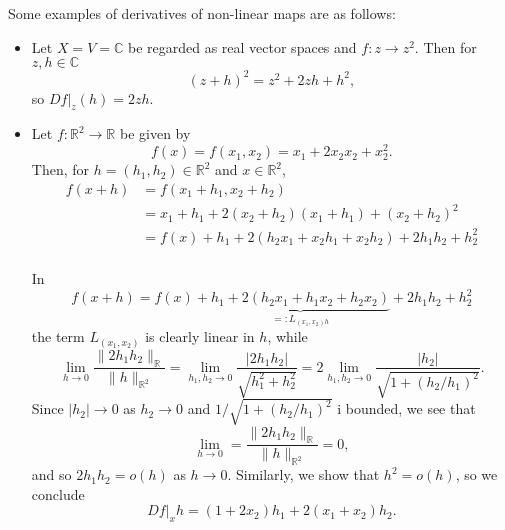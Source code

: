 \documentclass[10pt]{article}
\newcommand{\C}{\mathbb{C}}
\newcommand{\R}{\mathbb{R}}
\begin{document}
  \begin{example}
    Some examples of derivatives of non-linear maps are as follows:
    \begin{itemize}
      \item Let $X = V = \C$ be regarded as real vector spaces and $f:z \to z^{2}$.
      Then for $z,h \in \C$
      \[
        (z+h)^{2} = z^{2}+2zh+h^{2},  
      \]
      so $Df|_{z}(h) = 2zh$.

      \item Let $f:\R^{2} \to \R$ be given by 
      \[
        f(x) = f(x_{1},x_{2}) = x_{1} + 2x_{2}x_{2} + x_{2}^{2}.  
      \]
      Then, for $h = (h_{1}, h_{2}) \in \R^{2}$ and $x \in \R^{2}$,
      \[
        \begin{aligned}
          f(x+h) &= f(x_{1}+h_{1}, x_{2}+h_{2})\\
                 &= x_{1}+h_{1} + 2(x_{2}+h_{2})(x_{1}+h_{1}) + (x_{2}+h_{2})^{2}\\
                 &= f(x) + h_{1} + 2(h_{2}x_{1}+x_{2}h_{1}+x_{2}h_{2})+2h_{1}h_{2}+h_{2}^{2}\\
        \end{aligned}  
      \]
      
      In
      \[
        f(x+h) = f(x) + \underbrace{h_{1} + 2(h_{2}x_{1} + h_{1}x_{2} + h_{2}x_{2})}_{=:L_{(x_{1},x_{2})h}} + 2h_{1}h_{2} + h_{2}^{2}
      \]
      the term $L_{(x_{1},x_{2})}$ is clearly linear in $h$, while
      \[
        \lim_{h \rightarrow 0}\frac{\|2h_{1}h_{2}\|_{\R}}{\|h\|_{\R^{2}}}  = 
        \lim_{h_{1},h_{2} \to 0} \frac{|2h_{1}h_{2}|}{\sqrt{h_{1}^{2}+h_{2}^{2}}} = 
        2 \lim_{h_{1},h_{2} \to 0}\frac{|h_{2}|}{\sqrt{1+(h_{2}/h_{1})^{2}}}.  
      \]
      Since $|h_{2}| \to 0$ as $h_{2} \to 0$ and $1/\sqrt{1+(h_{2}/h_{1})^{2}}$ i bounded, we see that
      \[
        \lim_{h \to 0} = \frac{\|2h_{1}h_{2}\|_{\R}}{\|h\|_{\R^{2}}} = 0,  
      \]
      and so $2h_{1}h_{2} = o(h)$ as $h \to 0$. Similarly, we show that $h^{2} = o(h)$, so we conclude
      \[
        Df|_{x}h = (1+2x_{2})h_{1} + 2(x_{1}+x_{2})h_{2}.  
      \]
    \end{itemize}
  \end{example}
  
\end{document}
